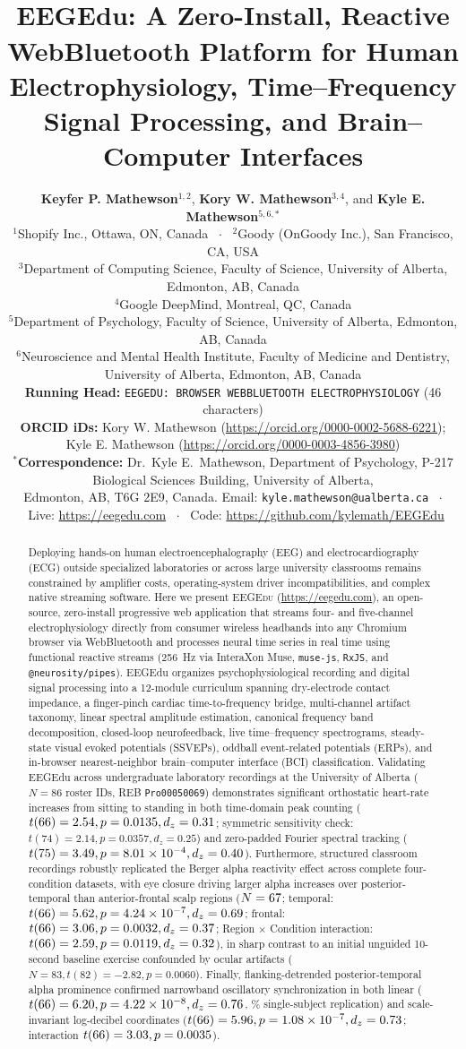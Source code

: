 \documentclass[11pt,letterpaper]{article}
\title{\vspace{-1.2em}{\small\textbf{Original Article --- Methodological Developments (\emph{Psychophysiology})}}\\[6pt]
\textbf{EEGEdu: A Zero-Install, Reactive WebBluetooth Platform for Human Electrophysiology, Time--Frequency Signal Processing, and Brain--Computer Interfaces}}
\author{\parbox{0.96\textwidth}{\centering
\textbf{Keyfer P. Mathewson}$^{1,2}$, \textbf{Kory W. Mathewson}$^{3,4}$, and \textbf{Kyle E. Mathewson}$^{5,6,*}$\\[6pt]
\footnotesize $^1$Shopify Inc., Ottawa, ON, Canada \ $\cdot$ \ $^2$Goody (OnGoody Inc.), San Francisco, CA, USA\\
\footnotesize $^3$Department of Computing Science, Faculty of Science, University of Alberta, Edmonton, AB, Canada\\
\footnotesize $^4$Google DeepMind, Montreal, QC, Canada\\
\footnotesize $^5$Department of Psychology, Faculty of Science, University of Alberta, Edmonton, AB, Canada\\
\footnotesize $^6$Neuroscience and Mental Health Institute, Faculty of Medicine and Dentistry, University of Alberta, Edmonton, AB, Canada\\[4pt]
\footnotesize \textbf{Running Head:} \texttt{EEGEDU: BROWSER WEBBLUETOOTH ELECTROPHYSIOLOGY} (46 characters)\\
\footnotesize \textbf{ORCID iDs:} Kory W. Mathewson (\url{https://orcid.org/0000-0002-5688-6221}); Kyle E. Mathewson (\url{https://orcid.org/0000-0003-4856-3980})\\
\footnotesize $^*$\textbf{Correspondence:} Dr.\ Kyle E.\ Mathewson, Department of Psychology, P-217 Biological Sciences Building, University of Alberta,\\
\footnotesize Edmonton, AB, T6G 2E9, Canada. Email: \texttt{kyle.mathewson@ualberta.ca} \ $\cdot$ \ Live: \url{https://eegedu.com} \ $\cdot$ \ Code: \url{https://github.com/kylemath/EEGEdu}
}}
\date{}
\providecommand{\NRoster}{86}
\providecommand{\ModTwoSymDF}{74}
\providecommand{\ModTwoSymT}{2.14}
\providecommand{\ModTwoSymP}{0.0357}
\providecommand{\ModTwoSymDz}{0.25}
\providecommand{\ModSixClassN}{83}
\providecommand{\ModSixClassDF}{82}
\providecommand{\ModSixClassT}{-2.82}
\providecommand{\ModSixClassP}{0.0060}
\begin{document}
\maketitle
\thispagestyle{fancy}

\begin{abstract}
\noindent Deploying hands-on human electroencephalography (EEG) and electrocardiography (ECG) outside specialized laboratories or across large university classrooms remains constrained by amplifier costs, operating-system driver incompatibilities, and complex native streaming software. Here we present \textsc{EEGEdu} (\url{https://eegedu.com}), an open-source, zero-install progressive web application that streams four- and five-channel electrophysiology directly from consumer wireless headbands into any Chromium browser via WebBluetooth and processes neural time series in real time using functional reactive streams (256~Hz via InteraXon Muse, \texttt{muse-js}, \texttt{RxJS}, and \texttt{@neurosity/pipes}). EEGEdu organizes psychophysiological recording and digital signal processing into a 12-module curriculum spanning dry-electrode contact impedance, a finger-pinch cardiac time-to-frequency bridge, multi-channel artifact taxonomy, linear spectral amplitude estimation, canonical frequency band decomposition, closed-loop neurofeedback, live time--frequency spectrograms, steady-state visual evoked potentials (SSVEPs), oddball event-related potentials (ERPs), and in-browser nearest-neighbor brain--computer interface (BCI) classification. Validating EEGEdu across undergraduate laboratory recordings at the University of Alberta ($N = \NRoster$ roster IDs, REB \texttt{Pro00050069}) demonstrates significant orthostatic heart-rate increases from sitting to standing in both time-domain peak counting ($t(66) = 2.54, p = 0.0135, d_z = 0.31$; symmetric sensitivity check: $t(\ModTwoSymDF) = \ModTwoSymT, p = \ModTwoSymP, d_z = \ModTwoSymDz$) and zero-padded Fourier spectral tracking ($t(75) = 3.49, p = 8.01\times 10^{-4}, d_z = 0.40$). Furthermore, structured classroom recordings robustly replicated the Berger alpha reactivity effect across complete four-condition datasets, with eye closure driving larger alpha increases over posterior-temporal than anterior-frontal scalp regions ($N = 67$; temporal: $t(66) = 5.62, p = 4.24\times 10^{-7}, d_z = 0.69$; frontal: $t(66) = 3.06, p = 0.0032, d_z = 0.37$; Region $\times$ Condition interaction: $t(66) = 2.59, p = 0.0119, d_z = 0.32$), in sharp contrast to an initial unguided 10-second baseline exercise confounded by ocular artifacts ($N = \ModSixClassN, t(\ModSixClassDF) = \ModSixClassT, p = \ModSixClassP$). Finally, flanking-detrended posterior-temporal alpha prominence confirmed narrowband oscillatory synchronization in both linear ($t(66) = 6.20, p = 4.22\times 10^{-8}, d_z = 0.76$, \PctRepTemp\% single-subject replication) and scale-invariant log-decibel coordinates ($t(66) = 5.96, p = 1.08\times 10^{-7}, d_z = 0.73$; interaction $t(66) = 3.03, p = 0.0035$).\\[6pt]

\end{abstract}
\end{document}
